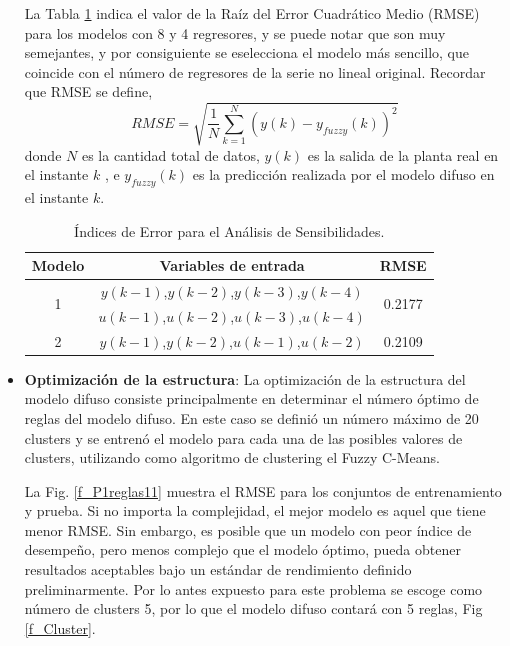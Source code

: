 \documentclass[12pt]{article}
\begin{document}
\begin{itemize}
La Tabla \ref{t_Error} indica el valor de la Raíz del Error Cuadrático Medio (RMSE) para los modelos con 8 y 4 regresores, y se puede notar que son muy semejantes, y por consiguiente se eselecciona el modelo más sencillo, que coincide con el número de regresores de la serie no lineal original. Recordar que RMSE se define,
\begin{equation}
RMSE=\sqrt{\frac{1}{N}\sum_{k=1}^{N}(y(k)-y_{fuzzy}(k))^2}
\label{e_RMSE}
\end{equation}
donde $N$ es la cantidad total de datos, $y(k)$ es la salida de la planta real en el instante $k$ , e $y_{fuzzy}(k)$ es la predicción realizada por el modelo difuso en el instante $k$.
\begin{table}[h!]
	\centering
	\caption{Índices de Error para el Análisis de Sensibilidades.}
	\begin{tabular}{|c|c|c|}
		\hline
		Modelo             & Variables de entrada                & RMSE                    \\ \hline
		\multirow{2}{*}{1} & $y(k-1)$,$y(k-2)$,$y(k-3)$,$y(k-4)$ & \multirow{2}{*}{0.2177} \\
		& $u(k-1)$,$u(k-2)$,$u(k-3)$,$u(k-4)$ &                         \\ \hline
		2                  & $y(k-1)$,$y(k-2)$,$u(k-1)$,$u(k-2)$ & 0.2109                  \\ \hline
	\end{tabular}
	\label{t_Error}%
\end{table}%

\item \textbf{Optimización de la estructura}:
La optimización de la estructura del modelo difuso consiste principalmente en determinar el número óptimo de reglas del modelo difuso. En este caso se definió un número máximo de 20 clusters y se entrenó el modelo para cada una de las posibles valores de clusters, utilizando como algoritmo de clustering el Fuzzy C-Means.

La Fig. \ref{f_P1reglas11} muestra el RMSE para los conjuntos de entrenamiento y prueba.  Si no importa la complejidad, el mejor modelo es aquel que
tiene menor RMSE. Sin embargo, es posible que un modelo con peor índice de
desempeño, pero menos complejo que el modelo óptimo, pueda obtener resultados
aceptables bajo un estándar de rendimiento definido preliminarmente. Por lo antes expuesto para este problema se escoge como número de clusters 5, por lo que el modelo difuso contará con 5 reglas, Fig \ref{f_Cluster}.


\end{itemize}
\end{document}

